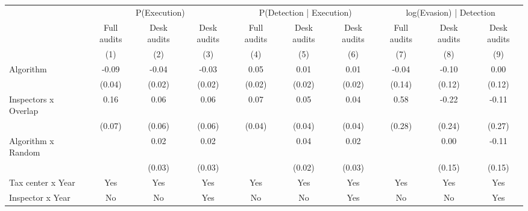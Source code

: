 \begin{tabular}{lccc|ccc|ccc} \toprule
\multicolumn{1}{l}{} & \multicolumn{3}{c}{P(Execution)} & \multicolumn{3}{c}{P(Detection | Execution)} & \multicolumn{3}{c}{log(Evasion) | Detection} \\\cmidrule(lr){2-4}\cmidrule(lr){5-7}\cmidrule(lr){8-10} \multicolumn{1}{l}{} & Full audits & Desk audits & Desk audits & Full audits & Desk audits & Desk audits & Full audits & Desk audits & Desk audits \\ \multicolumn{1}{l}{} & (1) & (2) & (3) & (4) & (5) & (6) & (7) & (8) & (9) \\ \midrule
Algorithm   &       -0.09\sym{**} &       -0.04         &       -0.03         &        0.05\sym{***}&        0.01         &        0.01         &       -0.04         &       -0.10         &        0.00         \\
            &      (0.04)         &      (0.02)         &      (0.02)         &      (0.02)         &      (0.02)         &      (0.02)         &      (0.14)         &      (0.12)         &      (0.12)         \\
\addlinespace
Inspectors x Overlap&        0.16\sym{**} &        0.06         &        0.06         &        0.07\sym{*}  &        0.05         &        0.04         &        0.58\sym{**} &       -0.22         &       -0.11         \\
            &      (0.07)         &      (0.06)         &      (0.06)         &      (0.04)         &      (0.04)         &      (0.04)         &      (0.28)         &      (0.24)         &      (0.27)         \\
\addlinespace
Algorithm x Random&                     &        0.02         &        0.02         &                     &        0.04\sym{*}  &        0.02         &                     &        0.00         &       -0.11         \\
            &                     &      (0.03)         &      (0.03)         &                     &      (0.02)         &      (0.03)         &                     &      (0.15)         &      (0.15)         \\
\midrule
Tax center x Year&         Yes         &         Yes         &         Yes         &         Yes         &         Yes         &         Yes         &         Yes         &         Yes         &         Yes         \\
Inspector x Year&          No         &          No         &         Yes         &          No         &          No         &         Yes         &          No         &          No         &         Yes         \\

\end{tabular}
